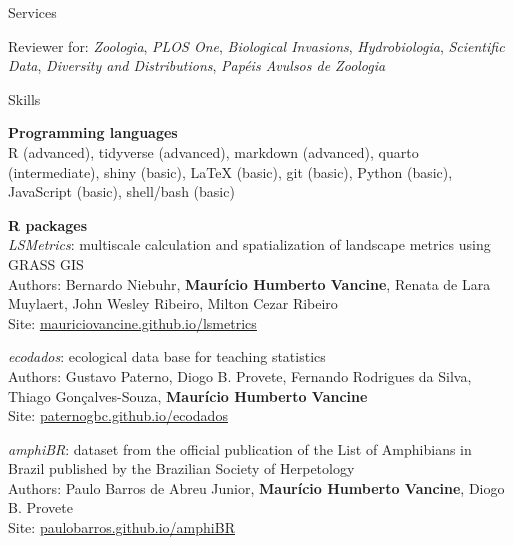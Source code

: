 \documentclass{resume}
\begin{document}

\begin{rSection}{Services}

Reviewer for: {\it Zoologia}, {\it PLOS One}, {\it Biological Invasions}, {\it Hydrobiologia}, {\it Scientific Data}, {\it Diversity and Distributions}, {\it Papéis Avulsos de Zoologia}

\end{rSection}


\begin{rSection}{Skills}

{\bf Programming languages}
\\ R (advanced), tidyverse (advanced), markdown (advanced), quarto (intermediate), shiny (basic), LaTeX (basic), git (basic), Python (basic), JavaScript (basic), shell/bash (basic)

{\bf R packages}
\\ {\it LSMetrics}: multiscale calculation and spatialization of landscape metrics using GRASS GIS  
\\ Authors: Bernardo Niebuhr, {\bf Maurício Humberto Vancine}, Renata de Lara Muylaert, John Wesley Ribeiro, Milton Cezar Ribeiro
\\ Site: \href{https://mauriciovancine.github.io/lsmetrics}{\underline{mauriciovancine.github.io/lsmetrics}}

{\it ecodados}: ecological data base for teaching statistics  
\\ Authors: Gustavo Paterno, Diogo B. Provete, Fernando Rodrigues da Silva, Thiago Gonçalves-Souza, {\bf Maurício Humberto Vancine}
\\ Site: \href{https://paternogbc.github.io/ecodados/}{\underline{paternogbc.github.io/ecodados}}

{\it amphiBR}: dataset from the official publication of the List of Amphibians in Brazil published by the Brazilian Society of Herpetology
\\ Authors: Paulo Barros de Abreu Junior, {\bf Maurício Humberto Vancine}, Diogo B. Provete
\\ Site: \href{https://paulobarros.github.io/amphiBR}{\underline{paulobarros.github.io/amphiBR}}


\end{rSection}
\end{document}
